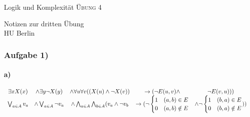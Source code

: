 \documentclass[12pt]{article}
\begin{document}
\begin{center}
\Large
Logik und Komplexität  \textsc{ Übung 4 }
\end{center}

\begin{flushright}
Notizen zur dritten Übung\\
HU Berlin \\

\vspace{2 mm}

\end{flushright}

\subsubsection*{Aufgabe 1)}
\paragraph*{a)}
\[ 
\begin{array}{ccccccc}
  \exists x X(x) &\land \exists y \neg X(y) &\land \forall u \forall v ( (X(u) \land \neg X(v) ) &\rightarrow (\neg E(u,v) \land &\neg E(v,u) ) ) \\
  \bigvee_{a\in A} v_a &\land \bigvee_{a\in A}\neg v_a &\land \bigwedge_{a\in A} \bigwedge_{b\in A} ( v_a \land \neg v_b& \rightarrow (\neg 
  \begin{cases}
    1&(a,b) \in E \\
    0&(a,b) \notin E
  \end{cases}
  & \land \neg 
  \begin{cases}
    1&(b,a) \in E \\
    0&(b,a) \notin E
  \end{cases}
  ) )
\end{array} \\
\] 
\end{document}
